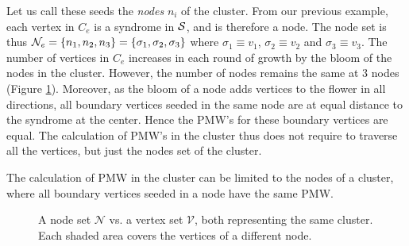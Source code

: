 Let us call these seeds the \emph{nodes} $n_i$ of the cluster. From our previous example, each vertex in $C_e$ is a syndrome in $\mathcal{S}$, and is therefore a node. The node set is thus $\mathcal{N}_e = \{n_1, n_2, n_3\} = \{\sigma_1, \sigma_2, \sigma_3\}$ where $\sigma_1 \equiv v_1$, $\sigma_2 \equiv v_2$ and $\sigma_3 \equiv v_3$. The number of vertices in $C_e$ increases in each round of growth by the bloom of the nodes in the cluster. However, the number of nodes remains the same at 3 nodes (Figure \ref{fig:nodesetpmw}). Moreover, as the bloom of a node adds vertices to the flower in all directions, all boundary vertices seeded in the same node are at equal distance to the syndrome at the center. Hence the PMW's for these boundary vertices are equal. The calculation of PMW's in the cluster thus does not require to traverse all the vertices, but just the nodes set of the cluster.

\begin{lemma}
  The calculation of PMW in the cluster can be limited to the nodes of a cluster, where all boundary vertices seeded in a node have the same PMW.
\end{lemma}

\begin{figure}
 \centering
  \caption{A node set $\mathcal{N}$ vs. a vertex set $\mathcal{V}$, both representing the same cluster. Each shaded area covers the vertices of a different  node.}\label{fig:nodesetpmw}
\end{figure}


